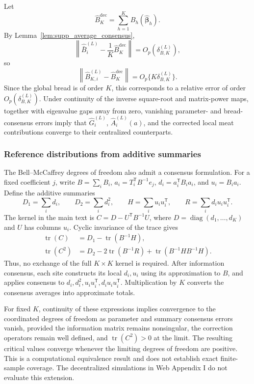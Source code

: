 \documentclass[12pt]{article}
\theoremstyle{remark}
\numberwithin{equation}{section}
\newcommand{\trans}{\mathsf{T}}
\newcommand{\bbeta}{\boldsymbol{\beta}}
\newcommand{\norm}[1]{\left\lVert#1\right\rVert}
\begin{document}
Let
\[
\widehat B_K^{\mathrm{dec}}
=
\sum_{h=1}^K B_h(\widehat{\bbeta}_h).
\]
By Lemma~\ref{lem:supp_average_consensus},
\[
\left\|
\widehat{\bar B}_i^{(L)}
-
\frac1K\widehat B_K^{\mathrm{dec}}
\right\|
=
O_p(\delta_{B,K}^{(L)}),
\]
so
\[
\norm{
\widehat B_{K,i}^{(L)}-
\widehat B_K^{\mathrm{dec}}
}
=
O_p\{K\delta_{B,K}^{(L)}\}.
\]
Since the global bread is of order \(K\), this corresponds to a relative
error of order \(O_p(\delta_{B,K}^{(L)})\). Under continuity of the inverse
square-root and matrix-power maps, together with eigenvalue gaps away from
zero, vanishing parameter- and bread-consensus errors imply that
\(\widehat G_i^{(L)}\), \(\widehat A_i^{(L)}(a)\), and the corrected local
meat contributions converge to their centralized counterparts.


\subsubsection{Reference distributions from additive summaries}

The Bell--McCaffrey degrees of freedom also admit a consensus formulation.
For a fixed coefficient $j$, write $B=\sum_i B_i$,
$a_i=T_i^{\trans}B^{-1}e_j$, $d_i=a_i^{\trans}B_i a_i$, and $u_i=B_i a_i$.
Define the additive summaries
\[
D_1=\sum_i d_i,\qquad D_2=\sum_i d_i^2,\qquad
H=\sum_i u_i u_i^{\trans},\qquad
R=\sum_i d_i u_i u_i^{\trans}.
\]
The kernel in the main text is $C=D-U^{\trans}B^{-1}U$, where
$D=\operatorname{diag}(d_1,\ldots,d_K)$ and $U$ has columns $u_i$.
Cyclic invariance of the trace gives
\begin{align}
\operatorname{tr}(C)
&=D_1-\operatorname{tr}(B^{-1}H),\\
\operatorname{tr}(C^2)
&=D_2-2\operatorname{tr}(B^{-1}R)
  +\operatorname{tr}(B^{-1}HB^{-1}H).
\end{align}
Thus, no exchange of the full $K\times K$ kernel is required. After information
consensus, each site constructs its local $d_i,u_i$ using its approximation to
$B$, and applies consensus to $d_i,d_i^2,u_i u_i^{\trans},d_i u_i u_i^{\trans}$.
Multiplication by $K$ converts the consensus averages into approximate totals.

For fixed $K$, continuity of these expressions implies convergence to the
coordinated degrees of freedom as parameter and summary consensus errors
vanish, provided the information matrix remains nonsingular, the correction
operators remain well defined, and $\operatorname{tr}(C^2)>0$ at the limit.
The resulting critical values converge whenever the limiting degrees of
freedom are positive. This is a computational equivalence result and does not
establish exact finite-sample coverage. The decentralized simulations in
Web Appendix I do not evaluate this extension.
\end{document}
